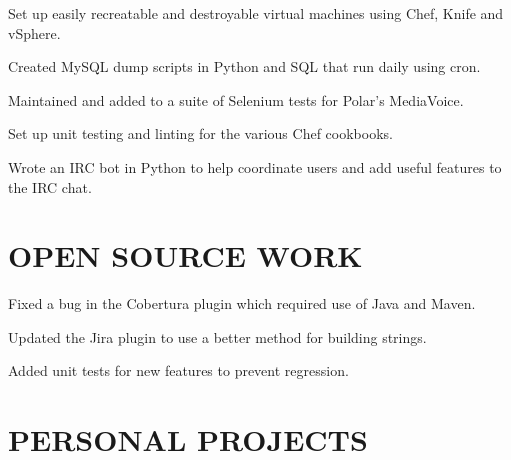 \documentclass[letterpaper]{deedy-resume-modified} %
\begin{document}
\begin{minipage}[t]{0.66\textwidth}
\sectionspace %



\begin{tightitemize}
\item Set up easily recreatable and destroyable virtual machines using Chef, Knife and vSphere.
\item Created MySQL dump scripts in Python and SQL that run daily using cron.
\item Maintained and added to a suite of Selenium tests for Polar's MediaVoice.
\item Set up unit testing and linting for the various Chef cookbooks.
\item Wrote an IRC bot in Python to help coordinate users and add useful features to the IRC chat.
\end{tightitemize}

\sectionspace %


\section{OPEN SOURCE WORK}

\begin{tightitemize}
\item Fixed a bug in the Cobertura plugin which required use of Java and Maven.
\item Updated the Jira plugin to use a better method for building strings.
\item Added unit tests for new features to prevent regression. 
\end{tightitemize}

\sectionspace %


\section{PERSONAL PROJECTS}


\end{minipage}
\end{document}
